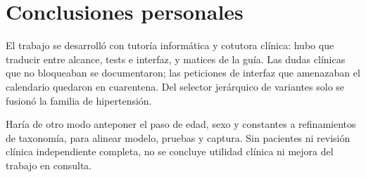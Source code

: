 \section{Conclusiones personales}

El trabajo se desarrolló con tutoría informática y cotutora clínica: hubo que
traducir entre alcance, tests e interfaz, y matices de la guía. Las dudas
clínicas que no bloqueaban se documentaron; las peticiones de interfaz que
amenazaban el calendario quedaron en cuarentena. Del selector jerárquico de
variantes solo se fusionó la familia de hipertensión.

Haría de otro modo anteponer el paso de edad, sexo y constantes a
refinamientos de taxonomía, para alinear modelo, pruebas y captura. Sin
pacientes ni revisión clínica independiente completa, no se concluye
utilidad clínica ni mejora del trabajo en consulta.
